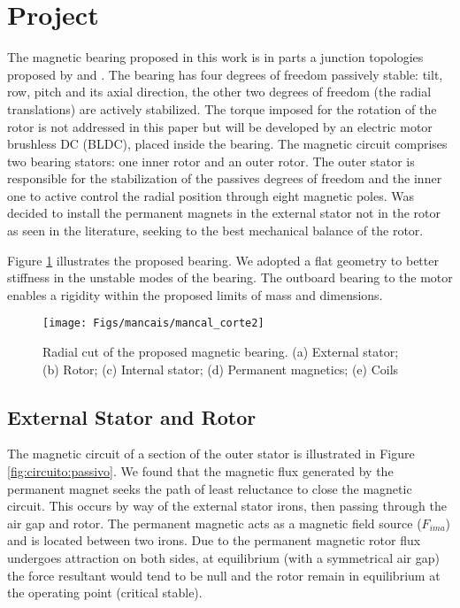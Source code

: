 \documentclass[10pt,fleqn,a4paper,twoside]{article}
\begin{document}
	
	\section{Project}
	
	The magnetic bearing proposed in this work is in parts a junction topologies proposed by \cite{Bernus1998} and \cite{Scharfe2001}. The bearing has four degrees of freedom passively stable: tilt, row, pitch and its axial direction, the other two degrees of freedom (the radial translations) are actively stabilized. The torque imposed for the rotation of the rotor is not addressed in this paper but will be developed by an electric motor brushless DC (BLDC), placed inside the bearing. The magnetic circuit comprises two bearing stators: one inner rotor and an outer rotor. The outer stator is responsible for the stabilization of the passives degrees of freedom and the inner one to active control the radial position through eight magnetic poles. Was decided to install the permanent magnets in the external stator not in the rotor as seen in the literature, seeking to the best mechanical balance of the rotor.
	
	Figure \ref{fig:mancal:corte} illustrates the proposed bearing. We adopted a flat geometry to better stiffness in the unstable modes of the bearing. The outboard bearing to the motor enables a rigidity within the proposed limits of mass and dimensions.
	
	\begin{figure}[ht]
		\centering
		\texttt{[image: Figs/mancais/mancal\_corte2]}
		\caption{Radial cut of the proposed magnetic bearing. (a) External stator; (b) Rotor; (c) Internal stator; (d) Permanent magnetics; (e) Coils}
		\label{fig:mancal:corte}
	\end{figure}
	
	\subsection{External Stator and Rotor}
	
	The magnetic circuit of a section of the outer stator is illustrated in Figure \ref{fig:circuito:passivo}. We found that the magnetic flux generated by the permanent magnet seeks the path of least reluctance to close the magnetic circuit. This occurs by way of the external stator irons, then passing through the air gap and rotor. The permanent magnetic acts as a magnetic field source ($ F_ {ima} $) and is located between two irons. Due to the permanent magnetic rotor flux undergoes attraction on both sides, at equilibrium (with a symmetrical air gap) the force resultant would tend to be null and the rotor remain in equilibrium at the operating point (critical stable). 
	
\end{document}
